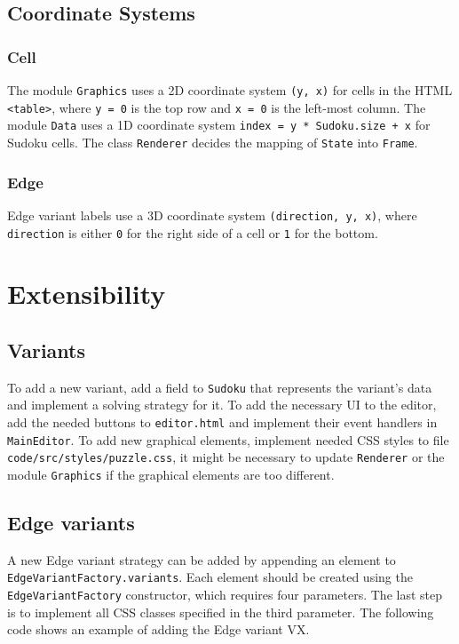 \subsection*{Coordinate Systems}

\subsubsection*{Cell}

The module \texttt{Graphics} uses a 2D coordinate system \texttt{(y, x)} for cells in the HTML \texttt{<table>},
where \texttt{y = 0} is the top row and \texttt{x = 0} is the left-most column.
The module \texttt{Data} uses a 1D coordinate system \texttt{index = y * Sudoku.size + x} for Sudoku cells.
The class \texttt{Renderer} decides the mapping of \texttt{State} into \texttt{Frame}.

\subsubsection*{Edge}

Edge variant labels use a 3D coordinate system \texttt{(direction, y, x)},
where \texttt{direction} is either \texttt{0} for the right side of a cell or \texttt{1} for the bottom.

\section{Extensibility}\label{sec:extensibility}

\subsection*{Variants}

To add a new variant, add a field to \texttt{Sudoku} that represents the variant's data
and implement a solving strategy for it.
To add the necessary UI to the editor, add the needed buttons to \texttt{editor.html}
and implement their event handlers in \texttt{MainEditor}.
To add new graphical elements, implement needed CSS styles to file \texttt{code/src/styles/puzzle.css},
it might be necessary to update \texttt{Renderer} or the module \texttt{Graphics}
if the graphical elements are too different.

\subsection*{Edge variants}
A new Edge variant strategy can be added by appending an element to \texttt{EdgeVariantFactory.variants}.
Each element should be created using the \texttt{EdgeVariantFactory} constructor,
which requires four parameters.
The last step is to implement all CSS classes specified in the third parameter.
The following code shows an example of adding the Edge variant VX\@.

